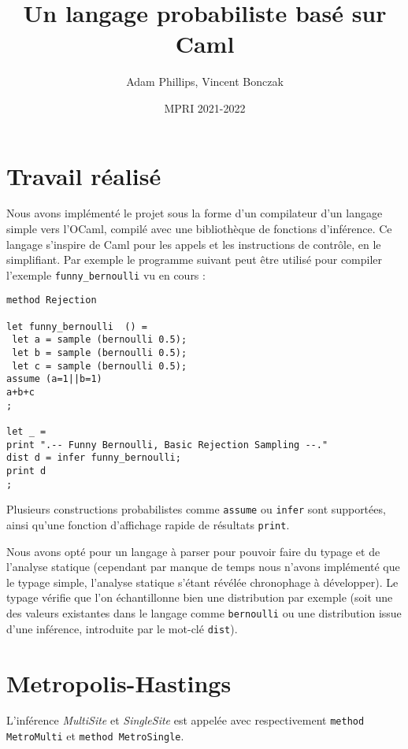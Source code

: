 \documentclass[svgnames]{article}
\begin{document}
\title{Un langage probabiliste basé sur Caml}

\author{Adam Phillips, Vincent Bonczak}

\date{MPRI 2021-2022}

\maketitle

\section{Travail réalisé}

Nous avons implémenté le projet sous la forme d'un compilateur d'un langage simple vers l'OCaml, compilé avec une bibliothèque de fonctions d'inférence.
Ce langage s'inspire de Caml pour les appels et les instructions de contrôle, en le simplifiant. Par exemple le programme suivant peut être utilisé pour compiler l'exemple \verb|funny_bernoulli| vu en cours :
\begin{lstlisting}
method Rejection

let funny_bernoulli  () =  
 let a = sample (bernoulli 0.5);
 let b = sample (bernoulli 0.5);  
 let c = sample (bernoulli 0.5); 
assume (a=1||b=1)
a+b+c
;

let _ = 
print ".-- Funny Bernoulli, Basic Rejection Sampling --."
dist d = infer funny_bernoulli;
print d
;
\end{lstlisting}

\bigskip

Plusieurs constructions probabilistes comme \verb|assume| ou \verb|infer| sont supportées, ainsi qu'une fonction d'affichage rapide de résultats \verb|print|.

Nous avons opté pour un langage à parser pour pouvoir faire du typage et de l'analyse statique (cependant par manque de temps nous n'avons implémenté que le typage simple, l'analyse statique s'étant révélée chronophage à développer).
Le typage vérifie que l'on échantillonne bien une distribution par exemple (soit une des valeurs existantes dans le langage comme \verb|bernoulli| ou une distribution issue d'une inférence, introduite par le mot-clé \lstinline{dist}).



\section{Metropolis-Hastings}

L'inférence \emph{MultiSite} et \emph{SingleSite} est appelée   avec respectivement \lstinline{method MetroMulti}  et \lstinline{method MetroSingle}.
\end{document}
